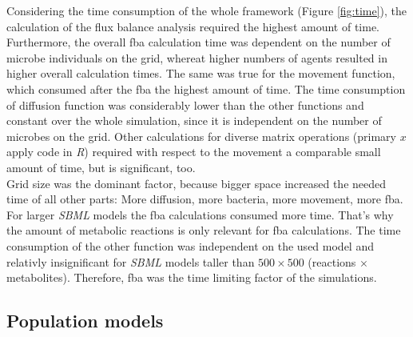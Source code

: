 Considering the time consumption of the whole framework (Figure \hyperref[fig:time]{\ref{fig:time}}), the calculation of the flux balance analysis required the highest amount of time.
Furthermore, the overall fba calculation time was dependent on the number of microbe individuals on the grid, whereat higher numbers of agents resulted in higher overall calculation times. The same was true for the movement function, which consumed after the fba the highest amount of time. The time consumption of diffusion function was considerably lower than the other functions and constant over the whole simulation, since it is independent on the number of microbes on the grid. Other
calculations for diverse matrix operations (primary $x$apply code in \textit{R}) required with respect to the movement a comparable small amount of time, but is significant, too.\\
Grid size was the dominant factor, because bigger space increased the needed time of all other parts: More diffusion, more bacteria, more movement, more fba.
For larger \textit{SBML} models the fba calculations consumed more time.
That's why the amount of metabolic reactions is only relevant for fba calculations.
The time consumption of the other function was independent on the used model and relativly insignificant for \textit{SBML} models taller than $500\times 500$ (reactions $\times$ metabolites).
Therefore, fba was the time limiting factor of the simulations.\\






\subsection{Population models}

